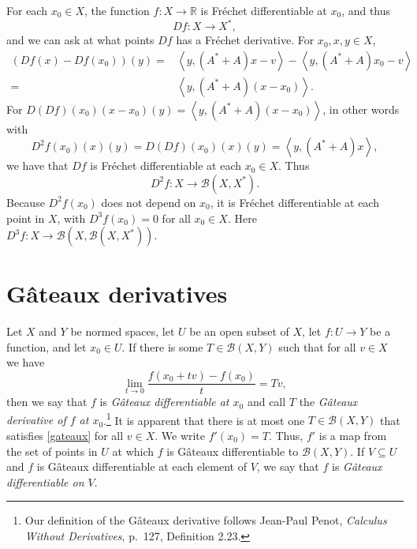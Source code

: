\documentclass{article}
\newcommand{\inner}[2]{\left\langle #1, #2 \right\rangle}
\theoremstyle{definition}
\begin{document}
For each $x_0 \in X$, the function $f:X \to \mathbb{R}$ is Fr\'echet differentiable at $x_0$, and thus
\[
Df:X \to X^*,
\]
and we can ask at what points $Df$ has a Fr\'echet derivative. 
For $x_0,x,y \in X$,
\begin{align*}
(Df(x)-Df(x_0))(y)=&\inner{y}{(A^*+A)x-v}-\inner{y}{(A^*+A)x_0-v}\\
=&\inner{y}{(A^*+A)(x-x_0)}.
\end{align*}
For $D(Df)(x_0)(x-x_0)(y)=\inner{y}{(A^*+A)(x-x_0)}$, in other words with
\[
D^2f(x_0)(x)(y)=D(Df)(x_0)(x)(y)=\inner{y}{(A^*+A)x},
\] 
we have that $Df$ is Fr\'echet differentiable at each $x_0 \in X$.
Thus
\[
D^2 f:X \to \mathscr{B}(X,X^*).
\]
Because $D^2 f(x_0)$ does not depend on $x_0$,  it is  Fr\'echet differentiable at each point in $X$, with
$D^3f(x_0)=0$ for all $x_0 \in X$. Here $D^3f:X \to \mathscr{B}(X,\mathscr{B}(X,X^*))$.



\section{G\^ateaux derivatives}
Let $X$ and $Y$ be normed spaces, let $U$ be an open subset of $X$, let $f:U \to Y$ be a function, and let $x_0 \in U$.
If there is some $T  \in \mathscr{B}(X,Y)$ such that for all $v \in X$ we have
\begin{equation}
\lim_{t \to 0} \frac{f(x_0+tv)-f(x_0)}{t}=T v,
\label{gateaux}
\end{equation}
then we say that $f$ is {\em G\^ateaux differentiable at $x_0$} and call $T$ the {\em G\^ateaux derivative of
$f$ at $x_0$}.\footnote{Our definition of the G\^ateaux derivative follows Jean-Paul Penot,
{\em Calculus Without Derivatives}, p.~127, Definition 2.23.} It is apparent that there is at most one
$T \in \mathscr{B}(X,Y)$ that satisfies \eqref{gateaux} for all $v \in X$. We write $f'(x_0)=T$. Thus, $f'$ is a map from the set
of points in $U$ at which $f$ is G\^ateaux differentiable to $\mathscr{B}(X,Y)$. If $V \subseteq U$ and $f$ is G\^ateaux differentiable
at each element of $V$, we say that $f$ is {\em G\^ateaux differentiable on $V$}.
\end{document}
